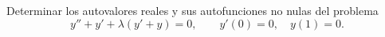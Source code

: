 Determinar los autovalores reales y sus autofunciones no nulas del problema
\[y''+y'+\lambda(y'+y)=0,\qquad y'(0)=0,\quad y(1)=0.\]
